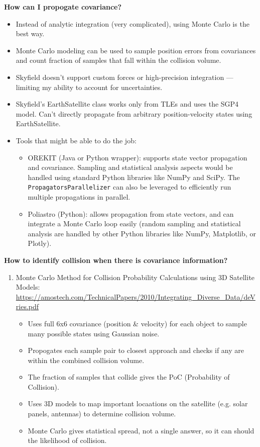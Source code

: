 \documentclass[12pt]{report}
\begin{document}
\noindent \textbf{How can I propogate covariance?}
  \begin{itemize}
    \item Instead of analytic integration (very complicated), using Monte Carlo is the best way.
    \item Monte Carlo modeling can be used to sample position errors from covariances and count fraction of samples that fall within the collision volume.
    \item Skyfield doesn’t support custom forces or high-precision integration — limiting my ability to account for uncertainties.
    \item Skyfield's EarthSatellite class works only from TLEs and uses the SGP4 model. Can’t directly propagate from arbitrary position-velocity states using EarthSatellite.
    \item Tools that might be able to do the job:
    \begin{itemize}
      \item OREKIT (Java or Python wrapper): supports state vector propagation and covariance. Sampling and statistical analysis aspects would be handled using standard Python libraries like NumPy and SciPy. The \texttt{PropagatorsParallelizer} can also be leveraged to efficiently run multiple propagations in parallel. 
      \item Poliastro (Python): allows propagation from state vectors, and can integrate a Monte Carlo loop easily (random sampling and statistical analysis are handled by other Python libraries like NumPy, Matplotlib, or Plotly).
    \end{itemize}
  \end{itemize}

\noindent \textbf{How to identify collision when there is covariance information?}
  \begin{enumerate}
    \item Monte Carlo Method for Collision Probability Calculations using 3D Satellite Models: \url{https://amostech.com/TechnicalPapers/2010/Integrating_Diverse_Data/deVries.pdf}
      \begin{itemize}
        \item Uses full 6x6 covariance (position \& velocity) for each object to sample many possible states using Gaussian noise.
        \item Propogates each sample pair to closest approach and checks if any are within the combined collision volume.
        \item The fraction of samples that collide gives the PoC (Probability of Collision).
        \item Uses 3D models to map important locaations on the satellite (e.g. solar panels, antennas) to determine collision volume.
        \item Monte Carlo gives statistical spread, not a single answer, so it can should the likelihood of collision.
      \end{itemize}
  \end{enumerate}
\end{document}
